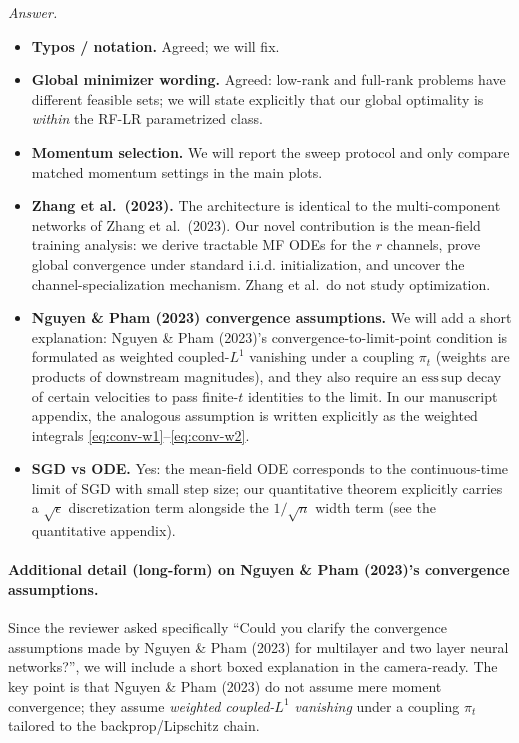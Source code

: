 \documentclass[11pt,a4paper]{article}
\newcommand{\NP}{Nguyen \& Pham (2023)}
\begin{document}
\textit{Answer.}
\begin{itemize}
  \item \textbf{Typos / notation.} Agreed; we will fix.
  \item \textbf{Global minimizer wording.} Agreed: low-rank and full-rank problems have different feasible sets; we will state explicitly that our global optimality is \emph{within} the RF-LR parametrized class.
  \item \textbf{Momentum selection.} We will report the sweep protocol and only compare matched momentum settings in the main plots.
  \item \textbf{Zhang et al.\ (2023).} The architecture is identical to the multi-component networks of Zhang et al.\ (2023). Our novel contribution is the mean-field training analysis: we derive tractable MF ODEs for the $r$ channels, prove global convergence under standard i.i.d. initialization, and uncover the channel-specialization mechanism. Zhang et al.\ do not study optimization.
  \item \textbf{\NP{} convergence assumptions.} We will add a short explanation: \NP{}'s convergence-to-limit-point condition is formulated as weighted coupled-$L^1$ vanishing under a coupling $\pi_t$ (weights are products of downstream magnitudes), and they also require an $\mathrm{ess\,sup}$ decay of certain velocities to pass finite-$t$ identities to the limit. In our manuscript appendix, the analogous assumption is written explicitly as the weighted integrals \eqref{eq:conv-w1}--\eqref{eq:conv-w2}.
  \item \textbf{SGD vs ODE.} Yes: the mean-field ODE corresponds to the continuous-time limit of SGD with small step size; our quantitative theorem explicitly carries a $\sqrt{\epsilon}$ discretization term alongside the $1/\sqrt{n}$ width term (see the quantitative appendix).
\end{itemize}

\paragraph{Additional detail (long-form) on \NP{}'s convergence assumptions.}
Since the reviewer asked specifically ``Could you clarify the convergence assumptions made by Nguyen \& Pham (2023) for multilayer and two layer neural networks?'', we will include a short boxed explanation in the camera-ready. The key point is that \NP{} do not assume mere moment convergence; they assume \emph{weighted coupled-$L^1$ vanishing} under a coupling $\pi_t$ tailored to the backprop/Lipschitz chain.
\end{document}
